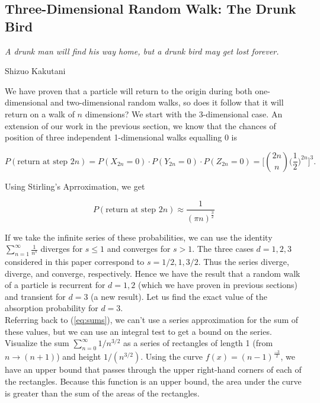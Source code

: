 \documentclass[11pt]{article}
\begin{document}
\subsection{Three-Dimensional Random Walk: The Drunk Bird \vspace{1em}}

\textit{A drunk man will find his way home, but a drunk bird may get lost forever.}
\begin{flushright}
Shizuo Kakutani \quad \quad \quad
\end{flushright}

We have proven that a particle will return to the origin during both one-dimensional and two-dimensional random walks, so does it follow that it will return on a walk of $n$ dimensions? We start with the 3-dimensional case. An extension of our work in the previous section, we know that the chances of position of three  independent 1-dimensional walks equalling 0 is 

\begin{equation}
P(\text{return at step } 2n) =  P(X_{2n} = 0) \cdot P(Y_{2n} = 0) \cdot P(Z_{2n} = 0) = \bigg[{2n \choose n}\bigg(\frac{1}{2}\bigg)^{2n}\bigg]^{3}.
\end{equation}

\noindent Using Stirling's Aprroximation, we get

\begin{equation}
P(\text{return at step } 2n) \approx \frac{1}{(\pi n)^{\frac{3}{2}}}
\label{eq:sums}
\end{equation}

If we take the infinite series of these probabilities, we can use the identity $\sum_{n=1}^{\infty} \frac{1}{n^s}$ diverges for $s \leq 1$ and converges for $s > 1$. The three cases $d = 1, 2, 3$ considered in this paper correspond to $s = 1/2, 1, 3/2$. Thus the series diverge, diverge, and converge, respectively. Hence we have the result that a random walk of a particle is recurrent for $d = 1, 2$ (which we have proven in previous sections) and transient for $d = 3$ (a new result). Let us find the exact value of the absorption probability for $d = 3$. \\


Referring back to (\ref{eq:sums}), we can't use a series approximation for the sum of these values, but we can use an integral test to get a bound on the series. Visualize the sum $\sum_{n=0}^{\infty} 1/n^{3/2}$ as a series of rectangles of length 1 (from $n \to (n + 1)$) and height $1/(n^{3/2})$. Using the curve $f(x) = (n-1)^{\frac{-3}{2}}$, we have an upper bound that passes through the upper right-hand corners of each of the rectangles. Because this function is an upper bound, the area under the curve is greater than the sum of the areas of the rectangles. 
\end{document}
